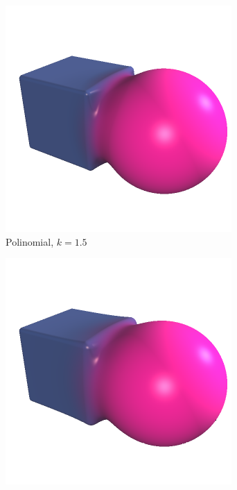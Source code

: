 \begin{figure}[htbp]
    \centering
    \begin{subfigure}[b]{0.25\textwidth}
        \centering
        \includegraphics[width=\textwidth]{Plantilla-TFG-master/img/unionMethodOG.png}
        \caption{Polinomial, $k=1.5$}
    \end{subfigure}
    \hfill
    \begin{subfigure}[b]{0.25\textwidth}
        \centering
        \includegraphics[width=\textwidth]{Plantilla-TFG-master/img/unionMethodExp.png}

\end{subfigure}
\end{figure}
